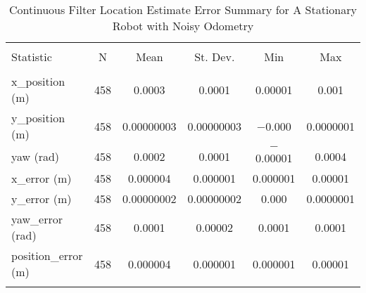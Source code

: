
\begin{table}[htbp] \centering 
  \caption{Continuous Filter Location Estimate Error Summary for A Stationary Robot with Noisy Odometry} 
  \label{tab:one_stationary_continuous_summary} 
\begin{tabular}{@{\extracolsep{5pt}}lccccc} 
\\[-1.8ex]\hline 
\hline \\[-1.8ex] 
Statistic & \multicolumn{1}{c}{N} & \multicolumn{1}{c}{Mean} & \multicolumn{1}{c}{St. Dev.} & \multicolumn{1}{c}{Min} & \multicolumn{1}{c}{Max} \\ 
\hline \\[-1.8ex] 
x\_position (m) & 458 & \num{0.0003} & \num{0.0001} & \num{0.00001} & \num{0.001} \\ 
y\_position (m) & 458 & \num{0.00000003} & \num{0.00000003} & $-$0.000 & \num{0.0000001} \\ 
yaw (rad) & 458 & \num{0.0002} & \num{0.0001} & $-$0.00001 & \num{0.0004} \\ 
x\_error (m) & 458 & \num{0.000004} & \num{0.000001} & \num{0.000001} & \num{0.00001} \\ 
y\_error (m) & 458 & \num{0.00000002} & \num{0.00000002} & \num{0.000} & \num{0.0000001} \\
yaw\_error (rad) & 458 & \num{0.0001} & \num{0.00002} & \num{0.0001} & \num{0.0001} \\ 
position\_error (m) & 458 & \num{0.000004} & \num{0.000001} & \num{0.000001} & \num{0.00001} \\ 
\hline \\[-1.8ex] 
\end{tabular} 
\end{table} 
